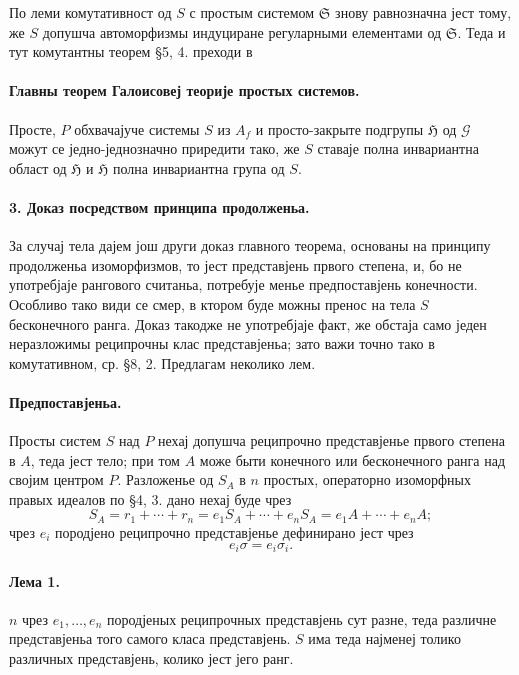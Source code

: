 ﻿\documentclass[11pt]{article}
\providecommand{\Gcal}{\mathcal G}
\begin{document}
По леми комутативност од \(S\) с простым системом \(\mathfrak S\) знову равнозначна јест тому, же \(S\) допушча автоморфизмы индуциране регуларными елементами од \(\mathfrak S\). Теда и тут комутантны теорем §5, 4. преходи в

\paragraph{Главны теорем Галоисовеј теорије простых системов.}
Просте, \(P\) обхвачајуче системы \(S\) из \(A_f\) и просто-закрыте подгрупы \(\mathfrak H\) од \(\Gcal\) можут се једно-једнозначно приредити тако, же \(S\) ставаје полна инвариантна област од \(\mathfrak H\) и \(\mathfrak H\) полна инвариантна група од \(S\).

\paragraph{3. Доказ посредством принципа продолженьа.}
За случај тела дајем још други доказ главного теорема, основаны на принципу продолженьа изоморфизмов, то јест представјень првого степена, и, бо не употребјаје рангового считаньа, потребује менье предпоставјень конечности. Особливо тако види се смер, в ктором буде можны пренос на тела \(S\) бесконечного ранга. Доказ такодже не употребјаје факт, же обстаја само једен неразложимы реципрочны клас представјеньа; зато важи точно тако в комутативном, ср. §8, 2. Предлагам неколико лем.

\paragraph{Предпоставјеньа.}
Просты систем \(S\) над \(P\) нехај допушча реципрочно представјенье првого степена в \(A\), теда јест тело; при том \(A\) може быти конечного или бесконечного ранга над својим центром \(P\). Разложенье од \(S_A\) в \(n\) простых, операторно изоморфных правых идеалов по §4, 3. дано нехај буде чрез
\[
        S_A=r_1+\cdots+r_n
            =e_1S_A+\cdots+e_nS_A
            =e_1A+\cdots+e_nA ;
\]
чрез \(e_i\) породјено реципрочно представјенье дефинирано јест чрез
\[
        e_i\sigma=e_i\sigma_i .
\]

\paragraph{Лема 1.}
\(n\) чрез \(e_1,\ldots,e_n\) породјеных реципрочных представјень сут разне, теда различне представјеньа того самого класа представјень. \(S\) има теда најменеј толико различных представјень, колико јест јего ранг.
\end{document}
